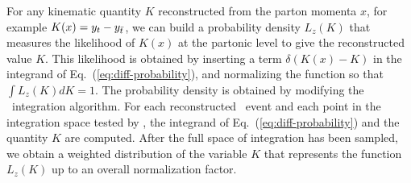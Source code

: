 \documentclass[aps,prd,twocolumn,showpacs,superscriptaddress,groupedaddress,floatfix]{revtex4}
\begin{document}
For any kinematic quantity $K$ reconstructed from the parton momenta $x$, for example $K(x)= y_t- y_{\bar t}$,
we can build a probability density $L_z(K)$  that measures
the likelihood 
of $K(x)$ at the partonic level to give the  reconstructed  value $K$.
This likelihood is obtained by inserting a  term $\delta(K(x)-K)$
in the integrand of Eq.~(\ref{eq:diff-probability}), and normalizing the function so that $\int L_z(K) dK=1$.
The probability density is obtained by modifying
the \vegas\ integration algorithm.
For each reconstructed \ttbar\ event and 
each point in the integration space tested by \vegas, 
the integrand of 
Eq.~(\ref{eq:diff-probability}) and the quantity $K$ are computed.
After the full space of integration has been sampled, we obtain a weighted distribution of the variable $K$ that
represents the function  $L_z(K)$ up to an overall normalization factor.
\end{document}
